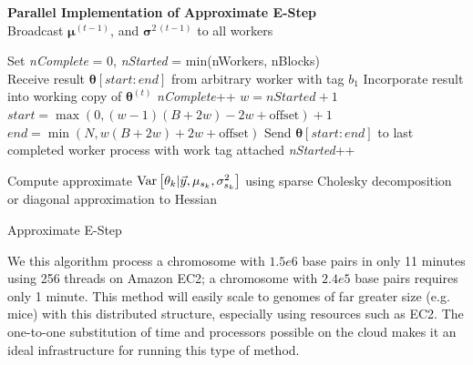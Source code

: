 \begin{algorithm}%
 \hspace{-8pt} \textbf{Parallel Implementation of Approximate E-Step}\\
 Broadcast $\bm \mu^{(t-1)}$, and $\bm \sigma^{2\,(t-1)}$ to all workers \;

  {

 Set \textit{nComplete} = 0, \textit{nStarted} = min(nWorkers, nBlocks) \\
  {
   Receive result $\bm \theta[start:end]$ from arbitrary worker with tag $b_1$ \;
   Incorporate result into working copy of $\bm \theta^{(t)}$ \;
   \textit{nComplete}++ \;
    {
     $w = nStarted + 1$\;
     $start = \max(0, (w - 1)(B + 2w) - 2w + \mbox{offset}) + 1$\;
     $end = \min(N, w(B + 2w) + 2w + \mbox{offset})$\;
     Send $\bm \theta[start:end] $ to last completed worker process with work tag attached\;
     \textit{nStarted}++\;
   }
 }
 }

 Compute approximate $\operatorname{Var} \left[ \theta_k | \vec y, \mu_{s_k}, \sigma^2_{s_k}  \right]$ using sparse Cholesky decomposition or diagonal approximation to Hessian\;

 \caption{Approximate E-Step \label{supp:nucleosomes:alg:parallel}}
\end{algorithm}

We this algorithm process a chromosome with $1.5e6$ base pairs in only 11 minutes using 256 threads on Amazon EC2; a chromosome with $2.4e5$ base pairs requires only 1 minute.
This method will easily scale to genomes of far greater size (e.g. mice) with this distributed structure, especially using resources such as EC2.
The one-to-one substitution of time and processors possible on the cloud makes it an ideal infrastructure for running this type of method.


\clearpage

